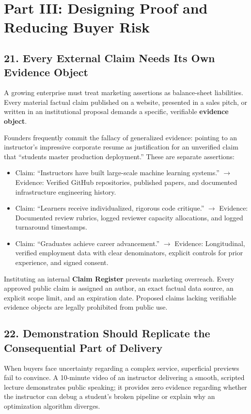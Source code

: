 \section*{Part III: Designing Proof and Reducing Buyer Risk}

\subsection*{21. Every External Claim Needs Its Own Evidence Object}

A growing enterprise must treat marketing assertions as balance-sheet liabilities. Every material factual claim published on a website, presented in a sales pitch, or written in an institutional proposal demands a specific, verifiable \textbf{evidence object}. 

Founders frequently commit the fallacy of generalized evidence: pointing to an instructor's impressive corporate resume as justification for an unverified claim that ``students master production deployment.'' These are separate assertions:
\begin{itemize}
\item Claim: ``Instructors have built large-scale machine learning systems.'' $\rightarrow$ Evidence: Verified GitHub repositories, published papers, and documented infrastructure engineering history.
\item Claim: ``Learners receive individualized, rigorous code critique.'' $\rightarrow$ Evidence: Documented review rubrics, logged reviewer capacity allocations, and logged turnaround timestamps.
\item Claim: ``Graduates achieve career advancement.'' $\rightarrow$ Evidence: Longitudinal, verified employment data with clear denominators, explicit controls for prior experience, and signed consent.
\end{itemize}

Instituting an internal \textbf{Claim Register} prevents marketing overreach. Every approved public claim is assigned an author, an exact factual data source, an explicit scope limit, and an expiration date. Proposed claims lacking verifiable evidence objects are legally prohibited from public use.

\subsection*{22. Demonstration Should Replicate the Consequential Part of Delivery}

When buyers face uncertainty regarding a complex service, superficial previews fail to convince. A 10-minute video of an instructor delivering a smooth, scripted lecture demonstrates public speaking; it provides zero evidence regarding whether the instructor can debug a student's broken pipeline or explain why an optimization algorithm diverges.

